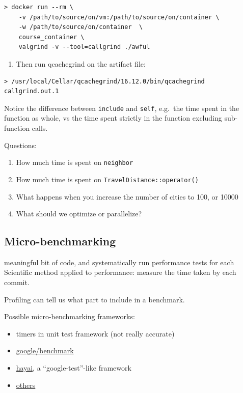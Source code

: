 \begin{verbatim}
> docker run --rm \
    -v /path/to/source/on/vm:/path/to/source/on/container \
    -w /path/to/source/on/container  \
    course_container \
    valgrind -v --tool=callgrind ./awful
\end{verbatim}

\begin{enumerate}
\def\labelenumi{\arabic{enumi}.}
\itemsep1pt\parskip0pt
\item
  Then run qcachegrind on the artifact file:
\end{enumerate}

\begin{verbatim}
> /usr/local/Cellar/qcachegrind/16.12.0/bin/qcachegrind callgrind.out.1
\end{verbatim}

Notice the difference between \texttt{include} and \texttt{self},
e.g.~the time spent in the function as whole, vs the time spent strictly
in the function excluding sub-function calls.

Questions:

\begin{enumerate}
\def\labelenumi{\arabic{enumi}.}
\itemsep1pt\parskip0pt
\item
  How much time is spent on \texttt{neighbor}
\item
  How much time is spent on \texttt{TravelDistance::operator()}
\item
  What happens when you increase the number of cities to 100, or 10000
\item
  What should we optimize or parallelize?
\end{enumerate}

\subsection{Micro-benchmarking}\label{micro-benchmarking}

meaningful bit of code, and systematically run performance tests for
each Scientific method applied to performance: measure the time taken by
each commit.

Profiling can tell us what part to include in a benchmark.

Possible micro-benchmarking frameworks:

\begin{itemize}
\itemsep1pt\parskip0pt
\item
  timers in unit test framework (not really accurate)
\item
  \href{https://github.com/google/benchmark}{google/benchmark}
\item
  \href{https://github.com/nickbruun/hayai}{hayai}, a
  ``google-test''-like framework
\item
  \href{http://www.bfilipek.com/2016/01/micro-benchmarking-libraries-for-c.html}{others}
\end{itemize}


